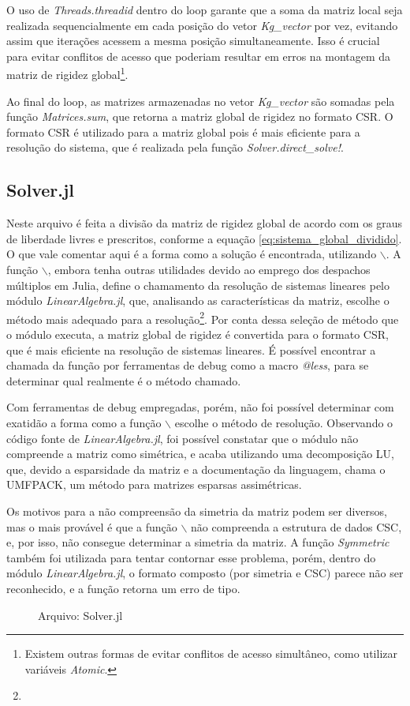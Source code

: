 O uso de \emph{Threads.threadid} dentro do loop garante que a soma da matriz local seja realizada sequencialmente em cada posição do vetor \emph{Kg\_vector} por vez, evitando assim que iterações acessem a mesma posição simultaneamente. Isso é crucial para evitar conflitos de acesso que poderiam resultar em erros na montagem da matriz de rigidez global\footnote{Existem outras formas de evitar conflitos de acesso simultâneo, como utilizar variáveis \emph{Atomic}.}.

Ao final do loop, as matrizes armazenadas no vetor \emph{Kg\_vector} são somadas pela função \emph{Matrices.sum}, que retorna a matriz global de rigidez no formato CSR. O formato CSR é utilizado para a matriz global pois é mais eficiente para a resolução do sistema, que é realizada pela função \emph{Solver.direct\_solve!}.

\subsection{Solver.jl}
 
Neste arquivo é feita a divisão da matriz de rigidez global de acordo com os graus de liberdade livres e prescritos, conforme a equação \ref{eq:sistema_global_dividido}. O que vale comentar aqui é a forma como a solução é encontrada, utilizando $\backslash$. A função $\backslash$, embora tenha outras utilidades devido ao emprego dos despachos múltiplos em Julia, define o chamamento da resolução de sistemas lineares pelo módulo \emph{LinearAlgebra.jl}, que, analisando as características da matriz, escolhe o método mais adequado para a resolução\footnote{}. Por conta dessa seleção de método que o módulo executa, a matriz global de rigidez é convertida para o formato CSR, que é mais eficiente na resolução de sistemas lineares. É possível encontrar a chamada da função por ferramentas de debug como a macro \emph{@less}, para se determinar qual realmente é o método chamado.

Com ferramentas de debug empregadas, porém, não foi possível determinar com exatidão a forma como a função $\backslash$ escolhe o método de resolução. Observando o código fonte de \emph{LinearAlgebra.jl}, foi possível constatar que o módulo não compreende a matriz como simétrica, e acaba utilizando uma decomposição LU, que, devido a esparsidade da matriz e a documentação da linguagem, chama o UMFPACK, um método para matrizes esparsas assimétricas. 

Os motivos para a não compreensão da simetria da matriz podem ser diversos, mas o mais provável é que a função $\backslash$ não compreenda a estrutura de dados CSC, e, por isso, não consegue determinar a simetria da matriz. A função \emph{Symmetric} também foi utilizada para tentar contornar esse problema, porém, dentro do módulo \emph{LinearAlgebra.jl}, o formato composto (por simetria e CSC) parece não ser reconhecido, e a função retorna um erro de tipo.

\begin{figure}[hbtp!]
    \caption{Arquivo: Solver.jl}
    
    \label{fig:solver}
\end{figure}